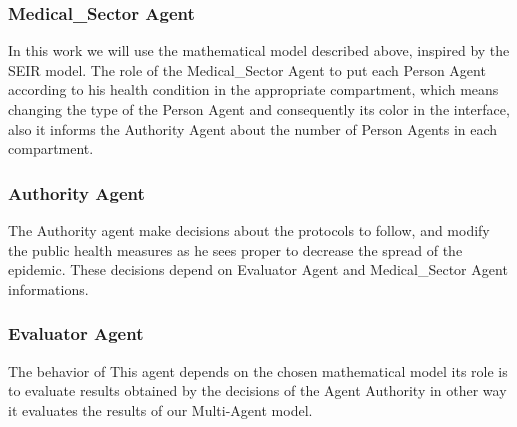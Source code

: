 \documentclass[paper=a4, fontsize=11.5pt]{scrartcl}
\numberwithin{equation}{section}		%
\numberwithin{figure}{section}			%
\numberwithin{table}{section}				%
\begin{document}
\subsubsection{Medical\_Sector Agent}
\quad In this work we will use the mathematical model described above, inspired by the SEIR model. The role of the Medical\_Sector Agent to put each Person Agent according to his health condition in the appropriate compartment, which means changing the type of the Person Agent and consequently its color in the interface, also it informs the Authority Agent about the number of Person Agents in each compartment.

\subsubsection{Authority Agent}
\quad The Authority agent make decisions about the protocols to follow, and modify the public health measures as he sees proper to decrease the spread of the epidemic. These decisions depend on Evaluator Agent and Medical\_Sector Agent informations.

\subsubsection{Evaluator Agent}
\quad The behavior of This agent depends on the chosen mathematical model its role is to evaluate results obtained by the decisions of the Agent Authority in other way it evaluates the results of our Multi-Agent model.
\end{document}
